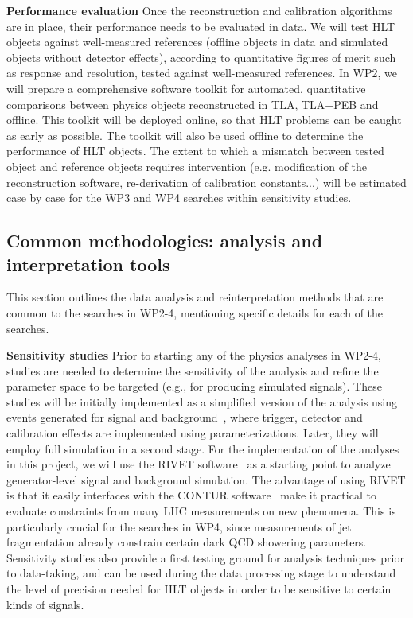 \textbf{Performance evaluation} Once the reconstruction and calibration algorithms are in place, their performance needs to be evaluated in data.
We will test HLT objects against well-measured references (offline objects in data and simulated objects without detector effects), according to quantitative figures of merit such as response and resolution, tested against well-measured references. 
In WP2, we will prepare a comprehensive software toolkit for automated, quantitative comparisons between physics objects reconstructed in TLA, TLA+PEB and offline. 
This toolkit will be deployed online, so that HLT problems can be caught as early as possible.
The toolkit will also be used offline to determine the performance of HLT objects.  
The extent to which a mismatch between tested object and reference objects requires intervention (e.g. modification of the reconstruction software, re-derivation of calibration constants...) will be estimated case by case for the WP3 and WP4 searches within sensitivity studies. 
 
\subsection{Common methodologies: analysis and interpretation tools}
\label{sub:CommonMethodsAnalysisTools}

This section outlines the data analysis and reinterpretation methods that are common to the searches in WP2-4, mentioning specific details for each of the searches. 

\textbf{Sensitivity studies} Prior to starting any of the physics analyses in WP2-4, studies are needed to determine the sensitivity of the analysis and refine the parameter space to be targeted (e.g., for producing simulated signals). 
These studies will be initially implemented as a simplified version of the analysis using events generated for signal and background~\cite{Alwall:2014hca,Sjostrand:2014zea}, where trigger, detector and calibration effects are implemented using parameterizations. Later, they will employ full simulation in a second stage. 
For the implementation of the analyses in this project, we will use the RIVET software~\cite{Buckley:2010ar} %
as a starting point to analyze generator-level signal and background simulation. 
The advantage of using RIVET is that it easily interfaces with the CONTUR software~\cite{Butterworth:2019wnt}%
make it practical to evaluate constraints from many LHC measurements on new phenomena. 
This is particularly crucial for the searches in WP4, since measurements of jet fragmentation already constrain certain dark QCD showering parameters. 
Sensitivity studies also provide a first testing ground for analysis techniques prior to data-taking, and can be used during the data processing stage 
to understand the level of precision needed for HLT objects in order to be sensitive to certain kinds of signals. 

